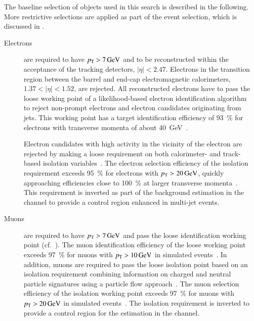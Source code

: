 The baseline selection of objects used in this search is described in the
following. More restrictive selections are applied as part of the event
selection, which is discussed in .
\begin{description}

\item[Electrons] are required to have $\pT > \SI{7}{\GeV}$ and to be
  reconstructed within the acceptance of the tracking detectors,
  $|\eta| < \num{2.47}$. Electrons in the transition region between the barrel
  and end-cap electromagnetic calorimeters, $1.37 < |\eta| < 1.52$, are
  rejected. All reconstructed electrons have to pass the loose working point of
  a likelihood-based electron identification algorithm to reject non-prompt
  electrons and electron candidates originating from jets. This working point
  has a target identification efficiency of \SI{93}{\percent} for electrons with
  transverse momenta of about \SI{40}{\GeV}~\cite{EGAM-2018-01,PERF-2017-01}.

  Electron candidates with high activity in the vicinity of the electron are
  rejected by making a loose requirement on both calorimeter- and track-based
  isolation variables~\cite{EGAM-2018-01}.
  The electron selection efficiency of the isolation requirement exceeds
  \SI{95}{\percent} for electrons with $\pT > \SI{20}{\GeV}$, quickly
  approaching efficiencies close to \SI{100}{\percent} at larger transverse
  momenta~\cite{EGAM-2018-01}. This requirement is inverted as part of the
  \faketauhadvis background estimation in the \lephad channel to provide a
  control region enhanced in multi-jet events.

\item[Muons] are required to have $\pT > \SI{7}{\GeV}$ and pass the loose
  identification working point (cf.~). The muon
  identification efficiency of the loose working point exceeds \SI{97}{\percent}
  for muons with $\pT > \SI{10}{\GeV}$ in simulated \ttbar
  events~\cite{MUON-2018-03}. In addition, muons are required to pass the loose
  isolation point based on an isolation requirement combining information on
  charged and neutral particle signatures using a particle flow
  approach~\cite{MUON-2018-03}. The muon selection efficiency of the isolation
  working point exceeds \SI{97}{\percent} for muons with $\pT > \SI{20}{\GeV}$
  in simulated \ttbar events~\cite{MUON-2018-03}. The isolation requirement is
  inverted to provide a control region for the \faketauhadvis estimation in the
  \lephad channel.


\end{description}

